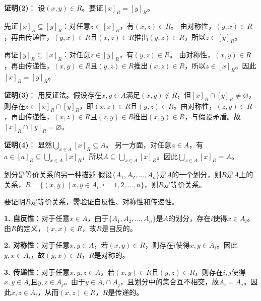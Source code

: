 \textbf{证明(2)}：
设$(x,y) \in R$。要证$[x]_R = [y]_R$。

先证$[x]_R \subseteq [y]_R$：对任意$z \in [x]_R$，有$(x,z) \in R$。
由对称性，$(y,x) \in R$，再由传递性，$(y,x) \in R$且$(x,z) \in R$推出$(y,z) \in R$，所以$z \in [y]_R$。

再证$[y]_R \subseteq [x]_R$：对任意$z \in [y]_R$，有$(y,z) \in R$。
由对称性，$(x,y) \in R$，再由传递性，$(x,y) \in R$且$(y,z) \in R$推出$(x,z) \in R$，所以$z \in [x]_R$。因此$[x]_R = [y]_R$。

\textbf{证明(3)}：
用反证法。假设存在$x,y \in A$满足$(x,y) \notin R$，但$[x]_R \cap [y]_R \neq \varnothing$，
则存在$z \in [x]_R \cap [y]_R$，即$(x,z) \in R$且$(y,z) \in R$。由对称性，$(z,y) \in R$，再由传递性，$(x,z) \in R$且$(z,y) \in R$推出$(x,y) \in R$，与假设矛盾。故$[x]_R \cap [y]_R = \varnothing$。

\textbf{证明(4)}：
显然$\bigcup_{x\in A} [x]_R \subseteq A$。
另一方面，对任意$a \in A$，有$a \in [a]_R \subseteq \bigcup_{x\in A} [x]_R$，所以$A \subseteq \bigcup_{x\in A} [x]_R$。因此$\bigcup_{x\in A} [x]_R = A$。
\begin{theorem}{划分是等价关系的另一种描述}{}
    假设$\{A_1, A_2, \ldots, A_n\}$是$A$的一个划分，则$R$是$A$上的关系，$R=\{(x,y) \mid x,y\in A_i,i=1,2,\ldots,n\}$，则$R$是等价关系。
\end{theorem}
要证明$R$是等价关系，需验证自反性、对称性和传递性。

\textbf{1. 自反性}：对于任意$x \in A$，由于$\{A_1, A_2, \ldots, A_n\}$是$A$的划分，存在$i$使得$x \in A_i$。由$R$的定义，$(x, x) \in R$，故$R$是自反的。

\textbf{2. 对称性}：对于任意$x, y \in A$，若$(x, y) \in R$，则存在$i$使得$x, y \in A_i$。因此$y, x \in A_i$，故$(y, x) \in R$，$R$是对称的。

\textbf{3. 传递性}：对于任意$x, y, z \in A$，若$(x, y) \in R$且$(y, z) \in R$，则存在$i, j$使得$x, y \in A_i$且$y, z \in A_j$。由于$y \in A_i \cap A_j$，且划分中的集合互不相交，故$A_i = A_j$。因此$x, z \in A_i$，从而$(x, z) \in R$，$R$是传递的。


